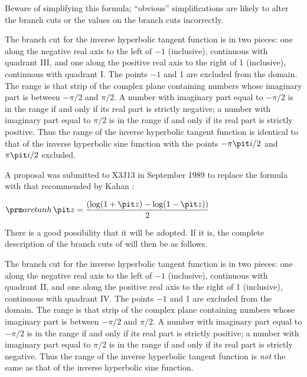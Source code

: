 \begin{flushdesc}
\begin{obsolete}
Beware of simplifying this formula; ``obvious'' simplifications are
likely to alter the branch cuts or the values on the branch cuts
incorrectly.

The branch cut for the inverse hyperbolic tangent function
is in two pieces: one along the negative real axis to the left of
$-1$ (inclusive), continuous with quadrant III, and one along
the positive real axis to the right of 1 (inclusive), continuous with
quadrant I.  The points $-1$ and 1 are excluded from the
domain.
The range is that strip of the complex plane containing
numbers whose imaginary part is between $-\pi/2$ and
$\pi/2$.  A number with imaginary part equal to $-\pi/2$
is in the range if and only if its real part is strictly negative; a number with
imaginary part equal to $\pi/2$ is in the range if and only if its real
part is strictly positive.  Thus the range of the inverse
hyperbolic tangent function is identical to
that of the inverse hyperbolic sine function with the points
$-\pi {\it i}/2$ and $\pi {\it i}/2$ excluded.
\end{obsolete}

\begin{newer}
A proposal was submitted to X3J13 in September 1989 to replace the
formula  with that recommended by Kahan \cite{KAHAN-COMPLEX-FNS}:
\begin{tabbing}
$ \displaystyle \arctanh {\it z}= { \left(\log(1+{\it z}) - \log(1-{\it z})\right) \over 2 } $
\end{tabbing}
There is a good possibility that it will be adopted.  If it is, the complete
description of the branch cuts of  will then be as follows.

The branch cut for the inverse hyperbolic tangent function
is in two pieces: one along the negative real axis to the left of
$-1$ (inclusive), continuous with quadrant II, and one along
the positive real axis to the right of 1 (inclusive), continuous with
quadrant IV.  The points $-1$ and 1 are excluded from the
domain.
The range is that strip of the complex plane containing
numbers whose imaginary part is between $-\pi/2$ and
$\pi/2$.  A number with imaginary part equal to $-\pi/2$
is in the range if and only if its real part is strictly positive; a number with
imaginary part equal to $\pi/2$ is in the range if and only if its real
part is strictly negative.  Thus the range of the inverse
hyperbolic tangent function is {\it not} the same as
that of the inverse hyperbolic sine function.
\end{newer}
\end{flushdesc}

